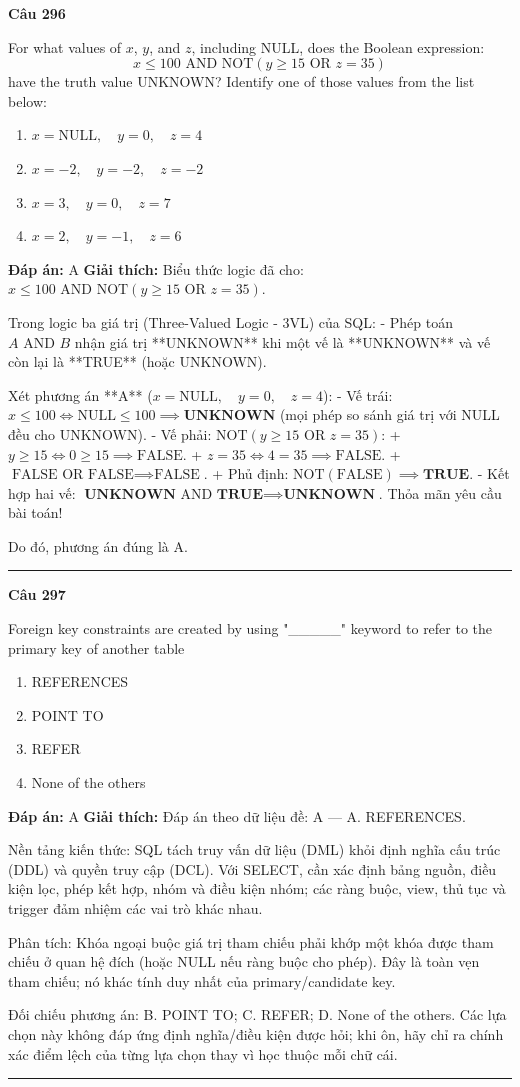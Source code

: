\documentclass[11pt,a4paper]{article}
\newenvironment{question}[1]{%
  \par\vspace{1em}\noindent\textbf{\large Câu #1}\par\vspace{0.4em}
}{%
  \par\vspace{1em}\hrule\vspace{0.6em}
}
\newenvironment{choices}{%
  \begin{enumerate}[label=\textbf{\Alph*.},leftmargin=2.2em,itemsep=2pt,topsep=3pt]
}{%
  \end{enumerate}
}
\newcommand{\choice}{\item}
\begin{document}
\begin{question}{296}
For what values of \(x\), \(y\), and \(z\), including NULL, does the Boolean expression:
\[x \le 100 \text{ AND NOT}(y \ge 15 \text{ OR } z = 35)\]
have the truth value UNKNOWN? Identify one of those values from the list below:
\begin{choices}
\choice \(x = \text{NULL}, \quad y = 0, \quad z = 4\)
\choice \(x = -2, \quad y = -2, \quad z = -2\)
\choice \(x = 3, \quad y = 0, \quad z = 7\)
\choice \(x = 2, \quad y = -1, \quad z = 6\)
\end{choices}
\textbf{Đáp án:} A
\textbf{Giải thích:} Biểu thức logic đã cho: \(x \le 100 \text{ AND NOT}(y \ge 15 \text{ OR } z = 35)\).

Trong logic ba giá trị (Three-Valued Logic - 3VL) của SQL:
- Phép toán \(A \text{ AND } B\) nhận giá trị **UNKNOWN** khi một vế là **UNKNOWN** và vế còn lại là **TRUE** (hoặc UNKNOWN).

Xét phương án **A** (\(x = \text{NULL}, \quad y = 0, \quad z = 4\)):
- Vế trái: \(x \le 100 \iff \text{NULL} \le 100 \implies \textbf{UNKNOWN}\) (mọi phép so sánh giá trị với NULL đều cho UNKNOWN).
- Vế phải: \(\text{NOT}(y \ge 15 \text{ OR } z = 35)\):
  + \(y \ge 15 \iff 0 \ge 15 \implies \text{FALSE}\).
  + \(z = 35 \iff 4 = 35 \implies \text{FALSE}\).
  + \(\text{FALSE OR FALSE} \implies \text{FALSE}\).
  + Phủ định: \(\text{NOT}(\text{FALSE}) \implies \textbf{TRUE}\).
- Kết hợp hai vế: \(\textbf{UNKNOWN} \text{ AND } \textbf{TRUE} \implies \textbf{UNKNOWN}\).
Thỏa mãn yêu cầu bài toán!

Do đó, phương án đúng là A.
\end{question}

\begin{question}{297}
Foreign key constraints are created by using "_____" keyword to refer to the primary key of another table
\begin{choices}
\choice REFERENCES
\choice POINT TO
\choice REFER
\choice None of the others
\end{choices}
\textbf{Đáp án:} A
\textbf{Giải thích:} Đáp án theo dữ liệu đề: A — A. REFERENCES.

Nền tảng kiến thức: SQL tách truy vấn dữ liệu (DML) khỏi định nghĩa cấu trúc (DDL) và quyền truy cập (DCL). Với SELECT, cần xác định bảng nguồn, điều kiện lọc, phép kết hợp, nhóm và điều kiện nhóm; các ràng buộc, view, thủ tục và trigger đảm nhiệm các vai trò khác nhau.

Phân tích: Khóa ngoại buộc giá trị tham chiếu phải khớp một khóa được tham chiếu ở quan hệ đích (hoặc NULL nếu ràng buộc cho phép). Đây là toàn vẹn tham chiếu; nó khác tính duy nhất của primary/candidate key.

Đối chiếu phương án: B. POINT TO; C. REFER; D. None of the others. Các lựa chọn này không đáp ứng định nghĩa/điều kiện được hỏi; khi ôn, hãy chỉ ra chính xác điểm lệch của từng lựa chọn thay vì học thuộc mỗi chữ cái.
\end{question}
\end{document}
